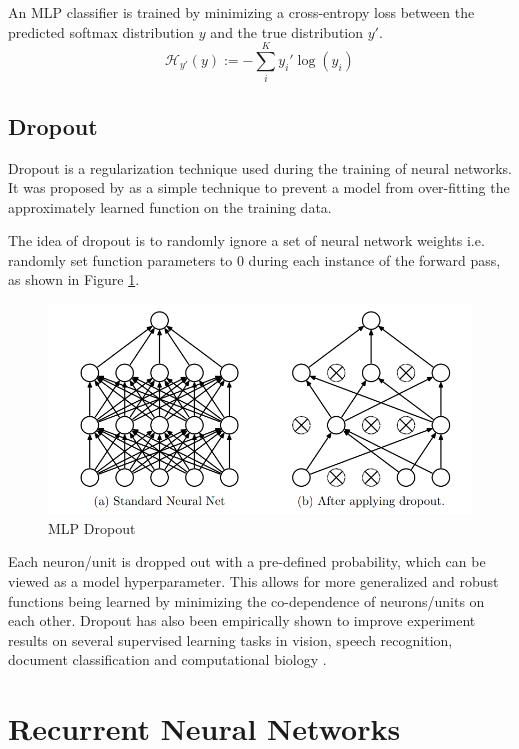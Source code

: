 An MLP classifier is trained by minimizing a cross-entropy loss between the predicted softmax distribution $y$ and the true distribution $y'$.
\begin{equation}
	\mathcal{H}_{y'} (y) := - \sum_{i}^K y_{i}' \log (y_i)
\end{equation}


\subsection{Dropout}

Dropout is a regularization technique used during the training of neural networks. It was proposed by \cite{srivastava2014dropout} as a simple technique to prevent a model from over-fitting the approximately learned function on the training data.

The idea of dropout is to randomly ignore a set of neural network weights i.e. randomly set function parameters to 0 during each instance of the forward pass, as shown in Figure \ref{fig:dropout}.

\begin{figure}[ht]
	\centering
	\includegraphics[width=\textwidth]{images/dropout}
	\caption{\label{fig:dropout} MLP Dropout}
\end{figure}

Each neuron/unit is dropped out with a pre-defined probability, which can be viewed as a model hyperparameter. This allows for more generalized and robust functions being learned by minimizing the co-dependence of neurons/units on each other. Dropout has also been empirically shown to improve experiment results on several supervised learning tasks in vision, speech recognition, document classification and computational biology \citep{srivastava2014dropout}.


\section{Recurrent Neural Networks}

